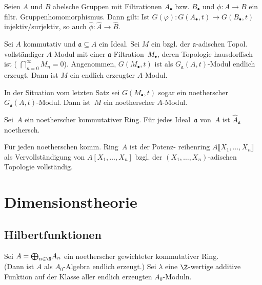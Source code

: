 \documentclass{cheat-sheet}
\newcommand{\aaa}{\mathfrak{a}}
\begin{document}

\begin{lem}
  Seien $A$ und $B$ abelsche Gruppen mit Filtrationen $A_\bullet$ bzw. $B_\bullet$ und $\phi : A \to B$ ein filtr. Gruppenhomomorphismus.
  Dann gilt:
  Ist $G(\varphi) : G(A_\bullet, t) \to G(B_\bullet, t)$ injektiv/surjektiv, so auch $\hat{\phi} : \hat{A} \to \hat{B}$.
\end{lem}

\begin{prop}
  Sei $A$ kommutativ und $\aaa \subseteq A$ ein Ideal.
  Sei $M$ ein bzgl. der $\aaa$-adischen Topol. vollständiger $A$-Modul mit einer $\aaa$-Filtration~$M_\bullet$, deren Topologie hausdorffsch ist (\dh{} ${\bigcap}_{n=0}^\infty M_n = 0$).
  Angenommen, $G(M_\bullet, t)$ ist als $G_\aaa(A, t)$-Modul endlich erzeugt.
  Dann ist $M$ ein endlich erzeugter $A$-Modul.
\end{prop}

\begin{kor}
  In der Situation vom letzten Satz sei $G(M_\bullet, t)$ sogar ein noetherscher $G_\aaa(A, t)$-Modul.
  Dann ist~$M$ ein noetherscher $A$-Modul.
\end{kor}

\begin{satz}
  Sei~$A$ ein noetherscher kommutativer Ring.
  Für jedes Ideal~$\aaa$ von~$A$ ist $\hat{A}_\aaa$ noethersch.
\end{satz}

\begin{folgerung}
  Für jeden noetherschen komm. Ring~$A$ ist der Potenz- reihenring $A \llbracket X_1, \ldots, X_n \rrbracket$ als Vervollständigung von $A [X_1, \ldots, X_n]$ bzgl. der $(X_1, \ldots, X_n)$-adischen Topologie vollständig.
\end{folgerung}

\newpage

\section{Dimensionstheorie}

\subsection{Hilbertfunktionen}


Sei $A = {\bigoplus}_{n \in \N} A_n$ ein noetherscher gewichteter kommutativer Ring. \\
(Dann ist $A$ als $A_0$-Algebra endlich erzeugt.)
Sei $\lambda$ eine $\Z$-wertige additive Funktion auf der Klasse aller endlich erzeugten $A_0$-Moduln.
\end{document}
